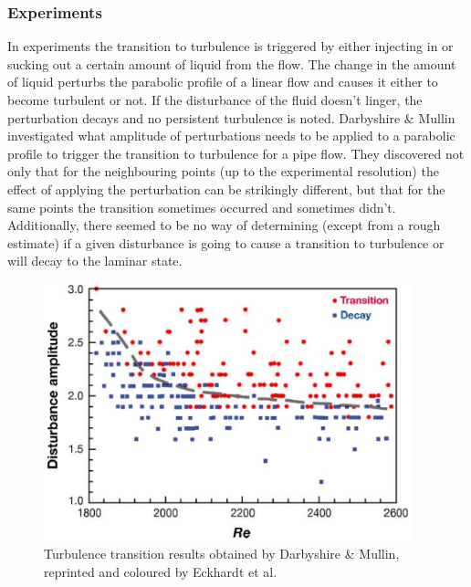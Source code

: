 \documentclass[11pt,a4paper]{article}
\begin{document}
\subsubsection{Experiments}
In experiments the transition to turbulence is triggered by either injecting in or sucking out a certain amount of liquid from the flow.
The change in the amount of liquid perturbs the parabolic profile of a linear flow and causes it either to become turbulent or not.
If the disturbance of the fluid doesn't linger, the perturbation decays and no persistent turbulence is noted.
Darbyshire \& Mullin\cite{Darbyshire95} investigated what amplitude of perturbations needs to be applied to a parabolic profile to trigger the transition to turbulence for a pipe flow.
They discovered not only that for the neighbouring points (up to the experimental resolution) the effect of applying the perturbation can be strikingly different, but that for the same points the transition sometimes occurred and sometimes didn't.
Additionally, there seemed to be no way of determining (except from a rough estimate) if a given disturbance is going to cause a transition to turbulence or will decay to the laminar state.

\begin{figure}[h]
    \centering
    \includegraphics[width=0.95\textwidth]{darbyshire95.png}
    \caption{Turbulence transition results obtained by Darbyshire \& Mullin\cite{Darbyshire95}, reprinted and coloured by Eckhardt et al.\cite{Eckhardt07}}\label{img:darbyshire_plot}
\end{figure}
\end{document}
